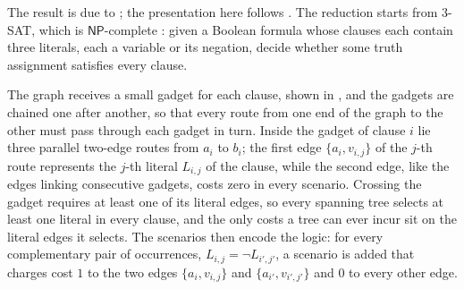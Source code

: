 The result is due to \textcite{KasperskiZielinski2009}; the presentation here follows \textcite[Theorem~8.5]{Goerigk2021RCO}.
The reduction starts from 3-SAT, which is $\mathsf{NP}$-complete \cite[Theorem~15.22]{KorteVygen2018}: given a Boolean formula whose clauses each contain three literals, each a variable or its negation, decide whether some truth assignment satisfies every clause.

The graph receives a small gadget for each clause, shown in , and the gadgets are chained one after another, so that every route from one end of the graph to the other must pass through each gadget in turn.
Inside the gadget of clause $i$ lie three parallel two-edge routes from $a_i$ to $b_i$; the first edge $\{a_i, v_{i,j}\}$ of the $j$-th route represents the $j$-th literal $L_{i,j}$ of the clause, while the second edge, like the edges linking consecutive gadgets, costs zero in every scenario.
Crossing the gadget requires at least one of its literal edges, so every spanning tree selects at least one literal in every clause, and the only costs a tree can ever incur sit on the literal edges it selects.
The scenarios then encode the logic: for every complementary pair of occurrences, $L_{i,j} = \neg L_{i',j'}$, a scenario is added that charges cost $1$ to the two edges $\{a_i, v_{i,j}\}$ and $\{a_{i'}, v_{i',j'}\}$ and $0$ to every other edge.


